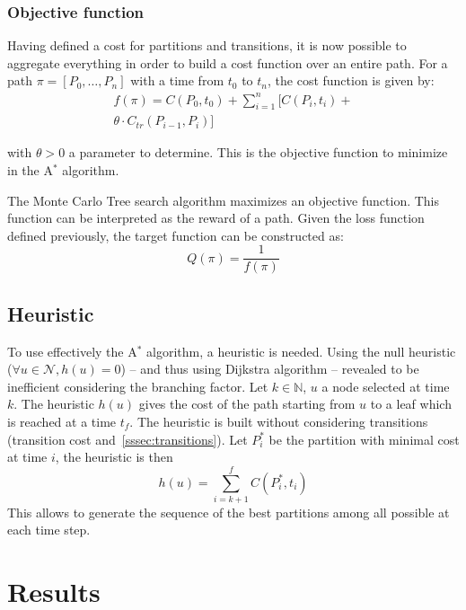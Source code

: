 \documentclass[oneside,twocolumn]{article}
\begin{document}
\subsubsection{Objective function}

Having defined a cost for partitions and transitions, it is now possible to
aggregate everything in order to build a cost function over an entire
path. For a path $\pi = [P_0, \dots, P_n]$ with a time from $t_0$ to $t_n$,
the cost function is given by:
\begin{equation}
  \begin{split}
    f(\pi) = C(P_0, t_0) + \sum_{i = 1}^{n} [C(P_i, t_i) +\\
    \theta \cdot C_{tr}(P_{i-1}, P_i)]
  \end{split}
\end{equation}

with $\theta > 0$ a parameter to determine.
This is the objective function to minimize in the A$^*$ algorithm.

The Monte Carlo Tree search algorithm maximizes an objective function. This function
can be interpreted as the reward of a path.
Given the loss function defined previously, the target function can be
constructed as:
\begin{equation}
  Q(\pi) = \frac{1}{f(\pi)}
\end{equation}


\subsection{Heuristic}
To use effectively the A\(^*\) algorithm, a heuristic is needed. Using the null
heuristic (\(\forall u \in \mathcal{N}, h(u) = 0\)) -- and thus using Dijkstra
algorithm -- revealed to be inefficient
considering the branching factor. Let \(k \in \mathbb{N}\), \(u\) a node
selected at time \(k\).
The heuristic \(h(u)\) gives the cost of the path starting from \(u\) to a
leaf which is reached at a time \(t_f\).
The heuristic is built without
considering transitions (transition cost and~\ref{sssec:transitions}).
Let \(P^*_i\) be the partition with minimal cost at time \(i\), the heuristic is
then
\begin{equation}
  h(u) = \sum_{i=k+1}^f C(P^*_i, t_i)
\end{equation}
This allows to generate
the sequence of the best partitions among all possible at each time step.

\section{Results}
\end{document}
